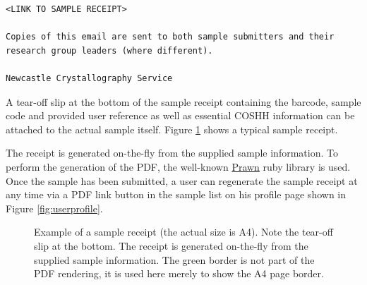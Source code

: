 \documentclass[12pt]{article}
\begin{document}
\begin{enumerate}[(i)]
\begin{verbatim}
<LINK TO SAMPLE RECEIPT>

Copies of this email are sent to both sample submitters and their
research group leaders (where different).

Newcastle Crystallography Service
\end{verbatim}
\normalsize

A tear-off slip at the bottom of the sample receipt
containing the barcode, sample code and provided user
reference as well as essential COSHH information can be attached to the
actual sample itself.
Figure \ref{fig:samplereceipt} shows a typical sample receipt.

The receipt is generated on-the-fly from the supplied sample information. 
To perform the generation of the PDF, the well-known 
\href{http://prawn.majesticseacreature.com/}{Prawn} ruby library is used.
Once the sample has been submitted, a user can regenerate the sample receipt
at any time via a PDF link button in the sample list on his profile page
shown in Figure \ref{fig:userprofile}.

\begin{figure}[!h]
\begin{center}
\caption{Example of a sample receipt (the actual size is A4).
Note the tear-off slip at the bottom. The receipt is generated
on-the-fly from the supplied sample information. The green border
is not part of the PDF rendering, it is used here merely to show
the A4 page border.\label{fig:samplereceipt}}
\end{center}
\end{figure}


\end{enumerate}
\end{document}
